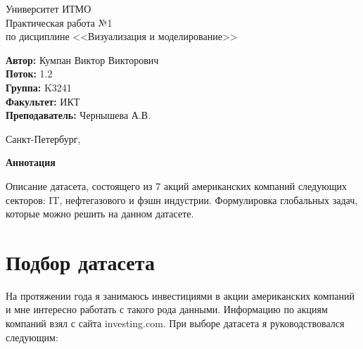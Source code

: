 \documentclass[12pt,a4paper]{article}
\begin{document}
	
\begin{titlepage}
	
\begin{center}
	\large Университет ИТМО\\[5cm]
	\LARGE Практическая работа №1\\
	\normalsize по дисциплине <<Визуализация и моделирование>>\\[5cm]
\end{center}
\begin{flushright}
		\begin{minipage}{0.6\textwidth}
		\begin{flushleft}
			\large
			\singlespacing 
			\textbf{Автор:} Кумпан Виктор Викторович\\
			\textbf{Поток:} 1.2\\
			\textbf{Группа:} K3241\\
			\textbf{Факультет:} ИКТ\\
			\textbf{Преподаватель:} Чернышева А.В.
		\end{flushleft}
	\end{minipage}
\end{flushright}

\vfill

\begin{center}
	{\large Санкт-Петербург, \the{}}
\end{center}
 
\end{titlepage}


\begin{center}
    \textbf{\Large{Аннотация}}
\end{center}

\large Описание датасета, состоящего из 7 акций американских компаний следующих секторов: IT, нефтегазового и фэшн индустрии. Формулировка глобальных задач, которые можно решить на данном датасете.

\section{Подбор датасета}

\large На протяжении года я занимаюсь инвестициями в акции американских компаний и мне интересно работать с такого рода данными. Информацию по акциям компаний взял с сайта investing.com. При выборе датасета я руководствовался следующим:
\end{document}

